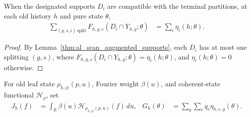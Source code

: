 \begin{lemma}
    \label{thm:al_scan_incidence_split_entropy}
    \leanok
    When the designated supports $D_i$ are compatible with the terminal
    partitions, at each old history $h$ and pure state $\theta$,
    \begin{align}
        \sum_{(g,s,i)\ \mathrm{split}} F_{h,g,s}(D_i\cap Y_{h,g};\theta)
         & = \sum_i\eta_i(h;\theta).
        \label{eq:al_scan_incidence_split_entropy}
    \end{align}
\end{lemma}
\begin{proof}\leanok
    By Lemma~\ref{thm:al_scan_augmented_supports}, each $D_i$ has at most one
    splitting $(g,s)$, where $F_{h,g,s}(D_i\cap Y_{h,g};\theta)=\eta_i(h;\theta)$,
    and $\eta_i(h;\theta)=0$ otherwise.
\end{proof}

\begin{definition}
    \label{def:al_scan_old_entropy_integral}
    \leanok
    For old leaf state $\rho_{h,\varnothing}(p,u)$, Fourier weight $\beta(u)$,
    and coherent-state functional $\mathcal H_\rho$, set
    \begin{align}
        J_h(f)                                         & = \int_{\mathbb R}\beta(u)
        \mathcal H_{\rho_{h,\varnothing}(p,u)}(f)\,du, &
        G_h(\theta)                                    & = \sum_g\sum_c q_c\eta_{h,c,g}(\theta).
        \label{eq:al_scan_old_entropy_integral}
    \end{align}
\end{definition}

